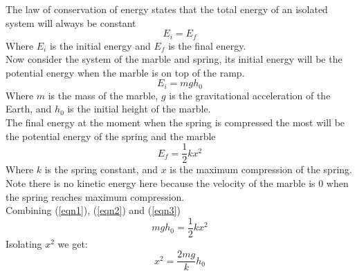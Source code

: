 The law of conservation of energy states that the total energy of an isolated system will
always be constant
\begin{equation}
    E_i=E_f \label{eqn1}
\end{equation}
Where $E_i$ is the initial energy and $E_f$ is the final energy.\\
Now consider the system of the marble and spring, its initial energy will be the potential
energy when the marble is on top of the ramp.
\begin{equation}
    E_i=mgh_0 \label{eqn2}
\end{equation}
Where $m$ is the mass of the marble, $g$ is the gravitational acceleration of the Earth, and $h_0$ is the initial height of the marble.\\
The final energy at the moment when the spring is compressed the most will be the potential energy of the spring and the marble
\begin{equation}
    E_f=\frac{1}{2}kx^2 \label{eqn3}
\end{equation}
Where $k$ is the spring constant, and $x$ is the maximum compression of the spring.\\
Note there is no kinetic energy here because the velocity of the marble is 0 when the spring
reaches maximum compression.\\
Combining (\ref{eqn1}), (\ref{eqn2}) and (\ref{eqn3})
\begin{equation}
    mgh_0=\frac{1}{2}kx^2
\end{equation}
Isolating $x^2$ we get:
\begin{equation}
    x^2=\frac{2mg}{k}h_0
\end{equation}